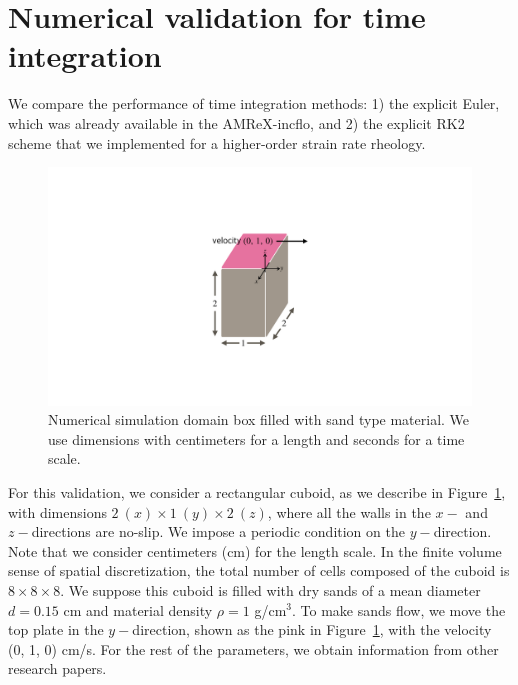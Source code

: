 \section{Numerical validation for time integration}
We compare the performance of time integration methods: 1) the explicit Euler, which was already available in the AMReX-incflo, and 2) the explicit RK2 scheme that we implemented for a higher-order strain rate rheology.
\begin{figure}[ht]
  \begin{center}
    \includegraphics[scale=0.3]{figures/fig_granular_domain.pdf}
    \end{center}
  \caption{Numerical simulation domain box filled with sand type material. We use dimensions with centimeters for a length and seconds for a time scale.}
  \label{fig_granular_domain}
\end{figure}
\par
For this validation, we consider a rectangular cuboid, as we describe in Figure~\ref{fig_granular_domain}, with dimensions $2 \ (x) \times 1 \  (y) \times 2 \ (z)$, where all the walls in the $x-$ and $z-$directions are no-slip. We impose a periodic condition on the $y-$direction. Note that we consider centimeters (cm) for the length scale. 
In the finite volume sense of spatial discretization, the total number of cells composed of the cuboid is $8 \times 8 \times 8$.
We suppose this cuboid is filled with dry sands of a mean diameter $d = 0.15$ cm and material density $\rho = 1$ g/cm$^3$. To make sands flow, we move the top plate in the $y-$direction, shown as the pink in Figure~\ref{fig_granular_domain}, with the velocity (0, 1, 0) cm/s.
For the rest of the parameters, we obtain information from other research papers.
